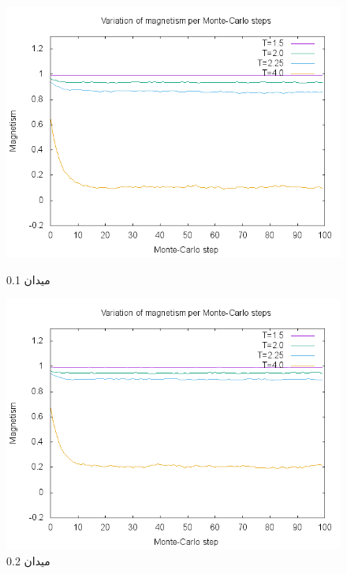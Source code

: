 \documentclass[a4paper,12pt]{article}
\begin{document}
\begin{figure}
\begin{center}
 \includegraphics[scale=.8]{H0-1.png}\caption{میدان 0.1}
\includegraphics[scale=.8]{H0-2.png}\caption{میدان 0.2}
\end{center}
\end{figure}
\end{document}
